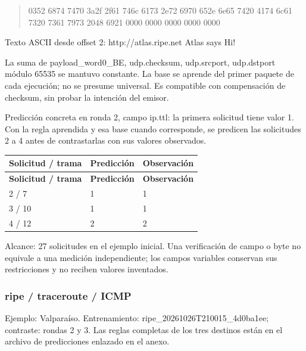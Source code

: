 \begin{quote}\ttfamily\footnotesize\raggedright 0352 6874 7470 3a2f 2f61 746c 6173 2e72 6970 652e 6e65 7420 4174 6c61 7320 7361 7973 2048 6921 0000 0000 0000 0000 0000\end{quote}
Texto ASCII desde offset 2: http://atlas.ripe.net Atlas says Hi!

La suma de payload\_\allowbreak{}word0\_\allowbreak{}BE, udp.checksum, udp.srcport, udp.dstport módulo 65535 se mantuvo constante. La base se aprende del primer paquete de cada ejecución; no se presume universal. Es compatible con compensación de checksum, sin probar la intención del emisor.

Predicción concreta en ronda 2, campo ip.ttl: la primera solicitud tiene valor 1. Con la regla aprendida y esa base cuando corresponde, se predicen las solicitudes 2 a 4 antes de contrastarlas con sus valores observados.

\begingroup
\fontsize{9}{11}\selectfont
\addtocounter{table}{-1}
\begin{longtable}{p{3.2cm}p{5.1cm}p{5.1cm}}
\toprule
\textbf{Solicitud / trama} & \textbf{Predicción} & \textbf{Observación} \\ \midrule
\endfirsthead
\toprule
\textbf{Solicitud / trama} & \textbf{Predicción} & \textbf{Observación} \\ \midrule
\endhead
2 / 7 & 1 & 1 \\
3 / 10 & 1 & 1 \\
4 / 12 & 2 & 2 \\
\bottomrule
\end{longtable}
\endgroup
Alcance: 27 solicitudes en el ejemplo inicial. Una verificación de campo o byte no equivale a una medición independiente; los campos variables conservan sus restricciones y no reciben valores inventados.

\subsubsection{ripe / traceroute / ICMP}
Ejemplo: Valparaíso. Entrenamiento: ripe\_\allowbreak{}20261026T210015\_\allowbreak{}4d0ba1ee; contraste: rondas 2 y 3. Las reglas completas de los tres destinos están en el archivo de predicciones enlazado en el anexo.

